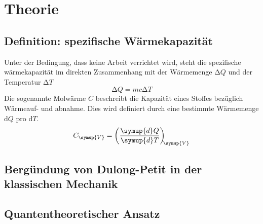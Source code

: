 \section{Theorie}
\label{sec:Theorie}
\subsection{Definition: spezifische Wärmekapazität}
Unter der Bedingung, dass keine Arbeit verrichtet wird, steht die spezifische
wärmekapazität im direkten Zusammenhang mit der Wärmemenge $\increment Q$ und
der Temperatur $\increment T$
\begin{equation}
  \increment Q = mc\increment T
\end{equation}
Die sogenannte Molwärme $C$ beschreibt die Kapazität eines Stoffes bezüglich
Wärmeauf- und abnahme. Dies wird definiert durch eine bestimmte Wärmemenge
d$Q$ pro d$T$.
\begin{equation}
  C_\symup{V} = \left(\frac{\symup{d}Q}{\symup{d}T}\right)_{\!\!\symup{V}}
\end{equation}
\subsection{Bergündung von Dulong-Petit in der klassischen Mechanik}
\subsection{Quantentheoretischer Ansatz}
